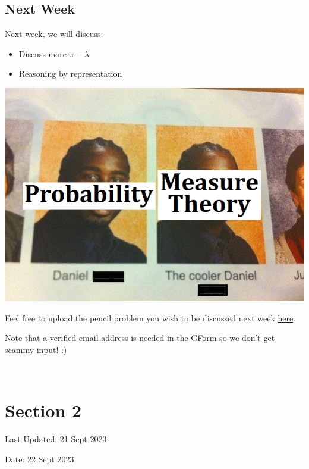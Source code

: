 \documentclass[
  letterpaper,
  DIV=11,
  numbers=noendperiod]{scrreprt}
\providecommand{\tightlist}{%
  \setlength{\itemsep}{0pt}\setlength{\parskip}{0pt}}\usepackage{longtable,booktabs,array}
\theoremstyle{definition}
\theoremstyle{plain}
\theoremstyle{remark}
\begin{document}
\hypertarget{next-week}{%
\section*{Next Week}\label{next-week}}


Next week, we will discuss:

\begin{itemize}
\tightlist
\item
  Discuss more \(\pi-\lambda\)
\item
  Reasoning by representation
\end{itemize}

\includegraphics{./assets/img/meme/meme1.png}

Feel free to upload the pencil problem you wish to be discussed next
week \href{https://forms.gle/RBmMNYJp4u3qD5W79}{here}.

Note that a verified email address is needed in the GForm so we don't
get scammy input! :)

\(\,\)


\hypertarget{section-2}{%
\chapter*{Section 2}\label{section-2}}


Last Updated: 21 Sept 2023

Date: 22 Sept 2023
\end{document}
